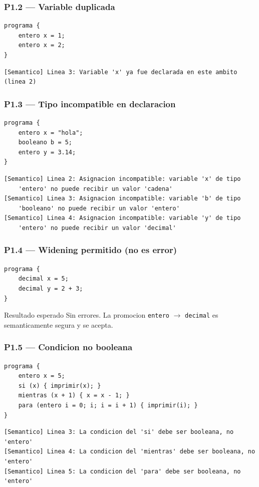 \documentclass[11pt,a4paper]{article}
\begin{document}
\subsubsection{P1.2 --- Variable duplicada}
\begin{lstlisting}[style=ml]
programa {
    entero x = 1;
    entero x = 2;
}
\end{lstlisting}
\begin{lstlisting}[style=err]
[Semantico] Linea 3: Variable 'x' ya fue declarada en este ambito (linea 2)
\end{lstlisting}

\subsubsection{P1.3 --- Tipo incompatible en declaracion}
\begin{lstlisting}[style=ml]
programa {
    entero x = "hola";
    booleano b = 5;
    entero y = 3.14;
}
\end{lstlisting}
\begin{lstlisting}[style=err]
[Semantico] Linea 2: Asignacion incompatible: variable 'x' de tipo
    'entero' no puede recibir un valor 'cadena'
[Semantico] Linea 3: Asignacion incompatible: variable 'b' de tipo
    'booleano' no puede recibir un valor 'entero'
[Semantico] Linea 4: Asignacion incompatible: variable 'y' de tipo
    'entero' no puede recibir un valor 'decimal'
\end{lstlisting}

\subsubsection{P1.4 --- Widening permitido (no es error)}
\begin{lstlisting}[style=ml]
programa {
    decimal x = 5;
    decimal y = 2 + 3;
}
\end{lstlisting}
\begin{prueba}{Resultado esperado}
Sin errores. La promocion \texttt{entero} $\rightarrow$ \texttt{decimal}
es semanticamente segura y se acepta.
\end{prueba}

\subsubsection{P1.5 --- Condicion no booleana}
\begin{lstlisting}[style=ml]
programa {
    entero x = 5;
    si (x) { imprimir(x); }
    mientras (x + 1) { x = x - 1; }
    para (entero i = 0; i; i = i + 1) { imprimir(i); }
}
\end{lstlisting}
\begin{lstlisting}[style=err]
[Semantico] Linea 3: La condicion del 'si' debe ser booleana, no 'entero'
[Semantico] Linea 4: La condicion del 'mientras' debe ser booleana, no 'entero'
[Semantico] Linea 5: La condicion del 'para' debe ser booleana, no 'entero'
\end{lstlisting}
\end{document}

